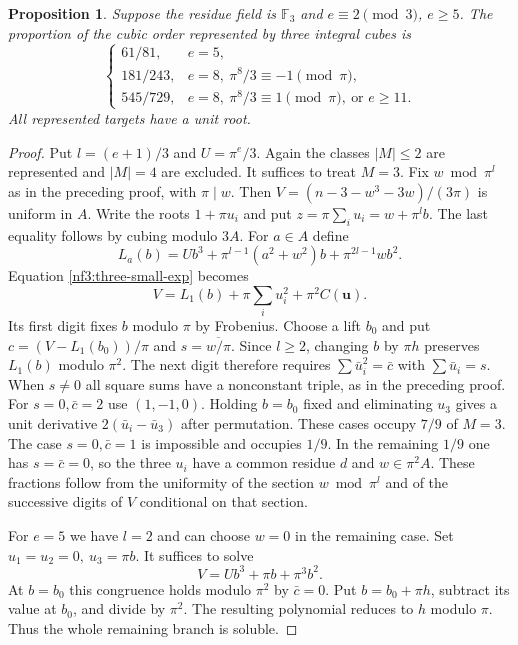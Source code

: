 \documentclass[11pt,letterpaper]{article}
\newtheorem{proposition}[proposition]{Proposition}
\theoremstyle{definition}
\numberwithin{equation}{section}
\begin{document}
\begin{proposition}\label{nf3:three-density-last}
Suppose the residue field is $\mathbb F_3$ and $e\equiv2\pmod3$,
$e\ge5$. The proportion of the cubic order represented by three
integral cubes is
\[
\begin{cases}
61/81,&e=5,\\
181/243,&e=8,\ \pi^8/3\equiv-1\pmod\pi,\\
545/729,&e=8,\ \pi^8/3\equiv1\pmod\pi,\ \text{or }e\ge11 .
\end{cases}
\]
All represented targets have a unit root.
\end{proposition}
\begin{proof}
Put $l=(e+1)/3$ and $U=\pi^e/3$. Again the classes $|M|\le2$ are
represented and $|M|=4$ are excluded. It suffices to treat $M=3$.
Fix $w\bmod\pi^l$ as in the preceding proof, with $\pi\mid w$.
Then $V=(n-3-w^3-3w)/(3\pi)$ is uniform in $A$.
Write the roots $1+\pi u_i$ and put
$z=\pi\sum_i u_i=w+\pi^l b$. The last equality follows by cubing
modulo $3A$. For $a\in A$ define
\[
  L_a(b)=U b^3+\pi^{l-1}(a^2+w^2)b+\pi^{2l-1}w b^2 .
\]
Equation \eqref{nf3:three-small-exp} becomes
\[
  V=L_1(b)+\pi\sum_i u_i^2+\pi^2C(\mathbf u).
\]
Its first digit fixes $b$ modulo $\pi$ by Frobenius. Choose a lift
$b_0$ and put $c=(V-L_1(b_0))/\pi$ and $s=\overline{w/\pi}$.
Since $l\ge2$, changing $b$ by $\pi h$ preserves $L_1(b)$ modulo
$\pi^2$. The next digit therefore requires
$\sum\bar u_i^2=\bar c$ with $\sum\bar u_i=s$.
When $s\ne0$ all square sums have a nonconstant triple, as in the
preceding proof. For $s=0,\bar c=2$ use $(1,-1,0)$.
Holding $b=b_0$ fixed and eliminating $u_3$ gives a unit derivative
$2(\bar u_i-\bar u_3)$ after permutation. These cases occupy $7/9$
of $M=3$. The case $s=0,\bar c=1$ is impossible and occupies $1/9$.
In the remaining $1/9$ one has $s=\bar c=0$, so the three $u_i$ have
a common residue $d$ and $w\in\pi^2 A$. These fractions follow from
the uniformity of the section $w\bmod\pi^l$ and of the successive
digits of $V$ conditional on that section.

For $e=5$ we have $l=2$ and can choose $w=0$ in the remaining
case. Set $u_1=u_2=0,\ u_3=\pi b$. It suffices to solve
\[
                     V=U b^3+\pi b+\pi^3 b^2.
\]
At $b=b_0$ this congruence holds modulo $\pi^2$ by $\bar c=0$.
Put $b=b_0+\pi h$, subtract its value at $b_0$, and divide by
$\pi^2$. The resulting polynomial reduces to $h$ modulo $\pi$.
Thus the whole remaining branch is soluble.


\end{proof}
\end{document}
